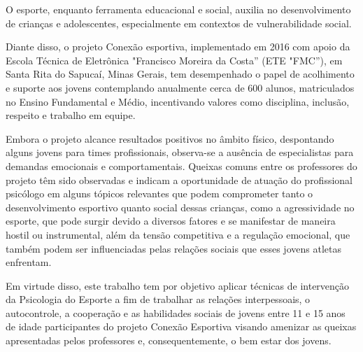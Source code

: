 \begin{Introducao} %
O esporte, enquanto ferramenta educacional e social, auxilia no desenvolvimento de crianças e adolescentes, especialmente em contextos de vulnerabilidade social. 

Diante disso, o projeto Conexão esportiva, implementado em 2016 com apoio da Escola Técnica de Eletrônica "Francisco Moreira da Costa” (ETE "FMC”), em Santa Rita do Sapucaí, Minas Gerais, tem desempenhado o papel de acolhimento e suporte aos jovens contemplando anualmente cerca de 600 alunos, matriculados no Ensino Fundamental e Médio, incentivando valores como disciplina, inclusão, respeito e trabalho em equipe.

Embora o projeto alcance resultados positivos no âmbito físico, despontando alguns jovens para times profissionais, observa-se a ausência de especialistas para demandas emocionais e comportamentais. Queixas comuns entre os professores do projeto têm sido observadas e indicam a oportunidade de atuação do profissional psicólogo em alguns tópicos relevantes que podem comprometer tanto o desenvolvimento esportivo quanto social dessas crianças, como a agressividade no esporte, que pode surgir devido a diversos fatores e se manifestar de maneira hostil ou instrumental, além da tensão competitiva e a regulação emocional, que também podem ser influenciadas pelas relações sociais que esses jovens atletas enfrentam.

Em virtude disso, este trabalho tem por objetivo aplicar técnicas de intervenção da Psicologia do Esporte a fim de trabalhar as relações interpessoais, o autocontrole, a cooperação e as habilidades sociais de jovens entre 11 e 15 anos de idade participantes do projeto Conexão Esportiva visando amenizar as queixas apresentadas pelos professores e, consequentemente, o bem estar dos jovens.
\end{Introducao}
